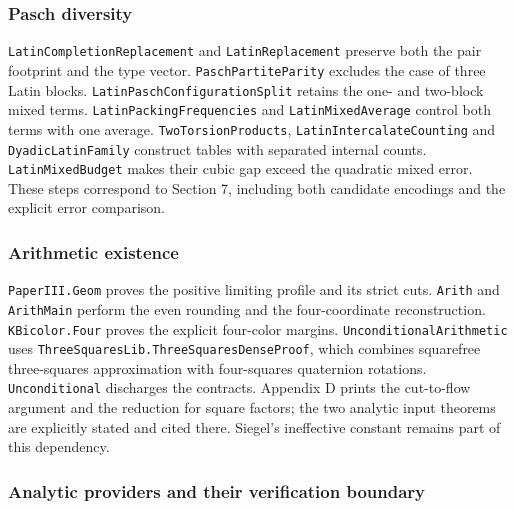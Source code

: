 \documentclass[english,11pt,a4paper]{article}
\begin{document}
\subsubsection{Pasch diversity}\label{pasch-diversity}

\texttt{Latin\allowbreak{}Completion\allowbreak{}Replacement} and \texttt{Latin\allowbreak{}Replacement} preserve both the pair footprint and the type vector. \texttt{Pasch\allowbreak{}Partite\allowbreak{}Parity} excludes the case of three Latin blocks. \texttt{Latin\allowbreak{}Pasch\allowbreak{}Configuration\allowbreak{}Split} retains the one- and two-block mixed terms. \texttt{Latin\allowbreak{}Packing\allowbreak{}Frequencies} and \texttt{Latin\allowbreak{}Mixed\allowbreak{}Average} control both terms with one average. \texttt{Two\allowbreak{}Torsion\allowbreak{}Products}, \texttt{Latin\allowbreak{}Intercalate\allowbreak{}Counting} and \texttt{Dyadic\allowbreak{}Latin\allowbreak{}Family} construct tables with separated internal counts. \texttt{Latin\allowbreak{}Mixed\allowbreak{}Budget} makes their cubic gap exceed the quadratic mixed error. These steps correspond to Section 7, including both candidate encodings and the explicit error comparison.

\subsubsection{Arithmetic existence}\label{arithmetic-existence}

\texttt{Paper\allowbreak{}III.\allowbreak{}Geom} proves the positive limiting profile and its strict cuts. \texttt{Arith} and \texttt{Arith\allowbreak{}Main} perform the even rounding and the four-coordinate reconstruction. \texttt{KBicolor.\allowbreak{}Four} proves the explicit four-color margins. \texttt{Unconditional\allowbreak{}Arithmetic} uses \texttt{Three\allowbreak{}Squares\allowbreak{}Lib.\allowbreak{}Three\allowbreak{}Squares\allowbreak{}Dense\allowbreak{}Proof}, which combines squarefree three-squares approximation with four-squares quaternion rotations. \texttt{Unconditional} discharges the contracts. Appendix D prints the cut-to-flow argument and the reduction for square factors; the two analytic input theorems are explicitly stated and cited there. Siegel's ineffective constant remains part of this dependency.

\subsubsection{Analytic providers and their verification boundary}\label{analytic-providers-and-their-verification-boundary}
\end{document}
